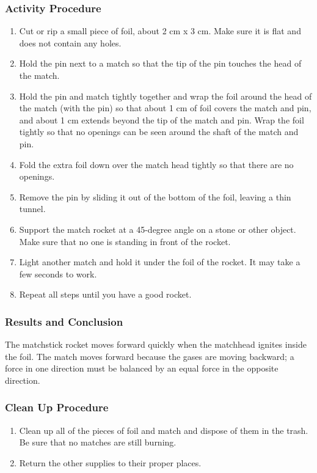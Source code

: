 \subsubsection*{Activity Procedure}
\begin{enumerate}
\item{Cut or rip a small piece of foil, about 2 cm x 3 cm. Make sure it is flat and does not contain any holes.} 
\item{Hold the pin next to a match so that the tip of the pin touches the head of the match.} 
\item{Hold the pin and match tightly together and wrap the foil around the head of the match (with the pin) so that about 1 cm of foil covers the match and pin, and about 1 cm extends beyond the tip of the match and pin. Wrap the foil tightly so that no openings can be seen around the shaft of the match and pin.} 
\item{Fold the extra foil down over the match head tightly so that there are no openings.} 
\item{Remove the pin by sliding it out of the bottom of the foil, leaving a thin tunnel.} 
\item{Support the match rocket at a 45-degree angle on a stone or other object. Make sure that no one is standing in front of the rocket.} 
\item{Light another match and hold it under the foil of the rocket. It may take a few seconds to work.} 
\item{Repeat all steps until you have a good rocket.} 
\end{enumerate}

\subsubsection*{Results and Conclusion}
The matchstick rocket moves forward quickly when the matchhead ignites inside the foil.  The match moves forward because the gases are moving backward; a force in one direction must be balanced by an equal force in the opposite direction.  

\subsubsection*{Clean Up Procedure}
\begin{enumerate}
\item{Clean up all of the pieces of foil and match and dispose of them in the trash. Be sure that no matches are still burning.} 
\item{Return the other supplies to their proper places.} 
\end{enumerate}

